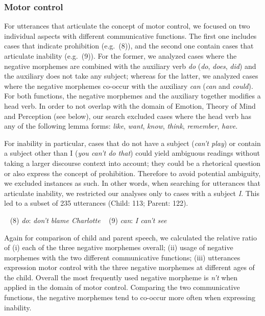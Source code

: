\documentclass[10pt, letterpaper]{article}
\begin{document}
\hypertarget{motor-control}{%
\subsubsection{Motor control}\label{motor-control}}

For utterances that articulate the concept of motor control, we focused
on two individual aspects with different communicative functions. The
first one includes cases that indicate prohibition (e.g.~(8)), and the
second one contain cases that articulate inability (e.g.~(9)). For the
former, we analyzed cases where the negative morphemes are combined with
the auxiliary verb \emph{do} (\emph{do}, \emph{does}, \emph{did}) and
the auxiliary does not take any subject; whereas for the latter, we
analyzed cases where the negative morphemes co-occur with the auxiliary
\emph{can} (\emph{can} and \emph{could}). For both functions, the
negative morphemes and the auxiliary together modifies a head verb. In
order to not overlap with the domain of Emotion, Theory of Mind and
Perception (see below), our search excluded cases where the head verb
has any of the following lemma forms: \emph{like}, \emph{want},
\emph{know}, \emph{think}, \emph{remember}, \emph{have}.

For inability in particular, cases that do not have a subject
(\emph{can't play}) or contain a subject other than I (\emph{you can't
do that}) could yield ambiguous readings without taking a larger
discourse context into account; they could be a rhetorical question or
also express the concept of prohibition. Therefore to avoid potential
ambiguity, we excluded instances as such. In other words, when searching
for utterances that articulate inability, we restricted our analyses
only to cases with a subject \emph{I}. This led to a subset of 235
utterances (Child: 113; Parent: 122).

~ (8) \emph{do}: \emph{don't blame Charlotte} ~ (9) \emph{can}: \emph{I
can't see} ~

Again for comparison of child and parent speech, we calculated the
relative ratio of (i) each of the three negative morphemes overall; (ii)
usage of negative morphemes with the two different communicative
functions; (iii) utterances expression motor control with the three
negative morphemes at different ages of the child. Overall the most
frequently used negative morpheme is \emph{n't} when applied in the
domain of motor control. Comparing the two communicative functions, the
negative morphemes tend to co-occur more often when expressing
inability.
\end{document}
